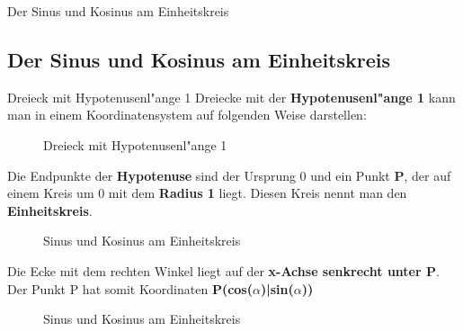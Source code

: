 \documentclass{standalone}
\begin{document}
\begin{frame}
  \begin{center}
    Der Sinus und Kosinus am Einheitskreis
  \end{center}
  \subsection{Der Sinus und Kosinus am Einheitskreis}
\end{frame}

\begin{frame}{Dreieck mit Hypotenusenl{"a}nge 1}
	Dreiecke mit der \textbf{Hypotenusenl{"a}nge 1} kann man in einem Koordinatensystem auf folgenden Weise darstellen:
	\begin{figure}[hb!]
		\centering
		\def\svgwidth{200px}
		
		\caption{Dreieck mit Hypotenusenl{"a}nge 1}
		\label{fig:rechtwinkliges_dreieck_hypotenuse_eins}
	\end{figure}
\end{frame}


\begin{frame}{1}
	Die Endpunkte der \textbf{Hypotenuse} sind der Ursprung 0 und ein Punkt \textbf{P}, der auf einem Kreis um 0 mit dem \textbf{Radius 1} liegt. Diesen Kreis nennt man den \textbf{Einheitskreis}.

	\begin{figure}[hb!]
		\centering
		\def\svgwidth{150px}
		
		\caption{Sinus und Kosinus am Einheitskreis}
		\label{fig:sin_cos_einheitskreis_1}
	\end{figure}
\end{frame}

\begin{frame}{2}
	Die Ecke mit dem rechten Winkel liegt auf der \textbf{x-Achse senkrecht unter P}. Der Punkt P hat somit Koordinaten \textbf{P(cos($\alpha$)|sin($\alpha$))}

	\begin{figure}[hb!]
		\centering
		\def\svgwidth{150px}
		
		\caption{Sinus und Kosinus am Einheitskreis}
		\label{fig:sin_cos_einheitskreis_2}
	\end{figure}
\end{frame}
\end{document}
